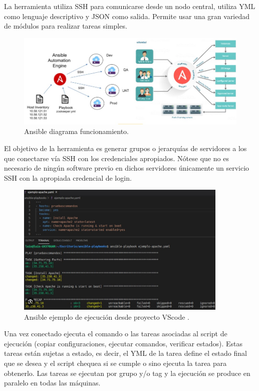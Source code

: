 La herramienta utiliza SSH para comunicarse desde un nodo central, utiliza YML como lenguaje descriptivo y JSON como salida. Permite usar una gran variedad de módulos para realizar tareas simples.
\begin{figure}[!htb]
\begin{center}
\includegraphics[width=1\textwidth]{./figuras/ansible_diagram.jpg}
\caption{Ansible diagrama funcionamiento\cite{i_ansible_1}\cite{i_ansible_2}.}
\label{F:ansible_diagram}
\end{center}
\end{figure}
El objetivo de la herramienta es generar grupos o jerarquías de servidores a los que conectarse vía SSH con los credenciales apropiados. Nótese que no es necesario de ningún software previo en dichos servidores únicamente un servicio SSH con la apropiada credencial de login.
\begin{figure}[!htb]
\begin{center}
\includegraphics[width=0.9\textwidth]{./figuras/ejemplo_ansible.jpg}
\caption{Ansible ejemplo de ejecución desde proyecto VScode .}
\label{F:ejemplo_ansible}
\end{center}
\end{figure}
Una vez conectado ejecuta el comando o las tareas asociadas al script de ejecución (copiar configuraciones, ejecutar comandos, verificar estados). Estas tareas están sujetas a estado, es decir, el YML de la tarea define el estado final que se desea y el script chequea si se cumple o sino ejecuta la tarea para obtenerlo. Las tareas se ejecutan por grupo y/o tag y la ejecución se produce en paralelo en todas las máquinas.

